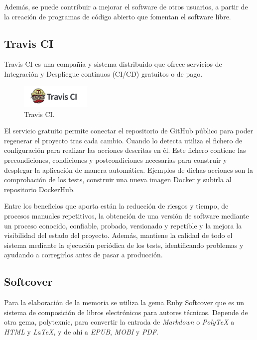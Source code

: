 Además, se puede contribuir a mejorar el software de otros usuarios, a partir de la creación de programas de código abierto que fomentan el software libre.

\subsection{Travis CI}

Travis CI es una compañia y sistema distribuido que ofrece servicios de Integración y Despliegue continuos (CI/CD) gratuitos o de pago.

\begin{figure}[H]
\centering
\includegraphics[width=0.3\textwidth]{images/figures/travisci.jpg}
\caption{Travis CI.\footnotemark}
\end{figure}


El servicio gratuito permite conectar el repositorio de GitHub público para poder regenerar el proyecto tras cada cambio. Cuando lo detecta utiliza el fichero de configuración  para realizar las acciones descritas en él. Este fichero contiene las precondiciones, condiciones y postcondiciones necesarias para construir y desplegar la aplicación de manera automática. Ejemplos de dichas acciones son la comprobación de los tests, construir una nueva imagen Docker y subirla al repositorio DockerHub.

Entre los beneficios que aporta están la reducción de riesgos y tiempo, de procesos manuales repetitivos, la obtención de una versión de software mediante un proceso conocido, confiable, probado, versionado y repetible y la mejora la visibilidad del estado del proyecto. Además, mantiene la calidad de todo el sistema mediante la ejecución periódica de los tests, identificando problemas y ayudando a corregirlos antes de pasar a producción.

\subsection{Softcover}

Para la elaboración de la memoria se utiliza la gema Ruby Softcover que es un sistema de composición de libros electrónicos para autores técnicos. Depende de otra gema, polytexnic, para convertir la entrada de \textit{Markdown} o \textit{PolyTeX} a \textit{HTML} y \textit{LaTeX}, y de ahí a \textit{EPUB}, \textit{MOBI} y \textit{PDF}.

